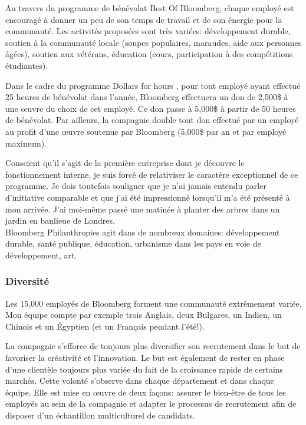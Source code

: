 \documentclass[11pt, oneside, titlepage, a4paper]{article}
\begin{document}
Au travers du programme de bénévolat Best Of Bloomberg, chaque employé est encouragé à donner un peu de son temps de travail et de son énergie pour la communauté. Les activités proposées sont très variées: développement durable, soutien à la communauté locale (soupes populaires, maraudes, aide aux personnes âgées), soutien aux vétérans, éducation (cours, participation à des compétitions étudiantes).

Dans le cadre du programme \og Dollars for hours \fg{}, pour tout employé ayant effectué 25 heures de bénévolat dans l'année, Bloomberg effectuera un don de 2,500\$ à une œuvre du choix de cet employé. Ce don passe à 5,000\$ à partir de 50 heures de bénévolat. Par ailleurs, la compagnie double tout don effectué par un employé au profit d'une œuvre soutenue par Bloomberg (5,000\$ par an et par employé maximum).

Conscient qu'il s'agit de la première entreprise dont je découvre le fonctionnement interne, je suis forcé de relativiser le caractère exceptionnel de ce programme. Je dois toutefois souligner que je n'ai jamais entendu parler d'initiative comparable et que j'ai été impressionné lorsqu'il m'a été présenté à mon arrivée. J'ai moi-même passé une matinée à planter des arbres dans un jardin en banlieue de Londres.
\\

Bloomberg Philanthropies agit dans de nombreux domaines: développement durable, santé publique, éducation, urbanisme dans les pays en voie de développement, art.
		\subsubsection{Diversité}
Les 15,000 employés de Bloomberg forment une communauté extrêmement variée. Mon équipe compte par exemple trois Anglais, deux Bulgares, un Indien, un Chinois et un Égyptien (et un Français pendant l'été!).

La compagnie s'efforce de toujours plus diversifier son recrutement dans le but de favoriser la créativité et l'innovation. Le but est également de rester en phase d'une clientèle toujours plus variée du fait de la croissance rapide de certains marchés. Cette volonté s'observe dans chaque département et dans chaque équipe. Elle est mise en œuvre de deux façons: assurer le bien-être de tous les employés au sein de la compagnie et adapter le processus de recrutement afin de disposer d'un échantillon multiculturel de candidats.
\\
\end{document}
